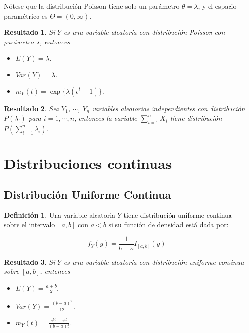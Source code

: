 \documentclass[
  10pt,
  spanish,
]{book}
\providecommand{\tightlist}{%
  \setlength{\itemsep}{0pt}\setlength{\parskip}{0pt}}
\newtheorem{proposition}{Resultado}[chapter]
\theoremstyle{definition}
\newtheorem{definition}{Definición}[chapter]
\theoremstyle{definition}
\theoremstyle{definition}
\theoremstyle{definition}
\theoremstyle{remark}
\begin{document}
Nótese que la distribución Poisson tiene solo un parámetro \(\theta=\lambda\), y el espacio paramétrico es \(\Theta=(0,\infty)\).

\begin{proposition}
\protect\hypertarget{prp:unnamed-chunk-14}{}{\label{prp:unnamed-chunk-14} }Si \(Y\) es una variable aleatoria con distribución Poisson con parámetro \(\lambda\), entonces

\begin{itemize}
\tightlist
\item
  \(E(Y)=\lambda\).
\item
  \(Var(Y)=\lambda\).
\item
  \(m_Y(t)=\exp\{\lambda(e^t-1)\}\).
\end{itemize}
\end{proposition}

\begin{proposition}
\protect\hypertarget{prp:unnamed-chunk-15}{}{\label{prp:unnamed-chunk-15} }Sea \(Y_1\), \(\cdots\), \(Y_n\) variables aleatorias independientes con distribución \(P(\lambda_i)\) para \(i=1,\cdots,n\), entonces la variable \(\sum_{i=1}^nX_i\) tiene distribución \(P(\sum_{i=1}^n\lambda_i)\).
\end{proposition}

\hypertarget{distribuciones-continuas}{%
\section{Distribuciones continuas}\label{distribuciones-continuas}}

\hypertarget{distribuciuxf3n-uniforme-continua}{%
\subsection{Distribución Uniforme Continua}\label{distribuciuxf3n-uniforme-continua}}

\begin{definition}
\protect\hypertarget{def:unnamed-chunk-16}{}{\label{def:unnamed-chunk-16} }Una variable aleatoria \(Y\) tiene distribución uniforme continua sobre el intervalo \([a,b]\) con \(a<b\) si su función de densidad está dada por:

\begin{equation}
f_Y(y)=\frac{1}{b-a}I_{[a,b]}(y)
\end{equation}
\end{definition}

\begin{proposition}
\protect\hypertarget{prp:unnamed-chunk-17}{}{\label{prp:unnamed-chunk-17} }Si \(Y\) es una variable aleatoria con distribución uniforme continua sobre \([a,b]\), entonces

\begin{itemize}
\tightlist
\item
  \(E(Y)=\frac{a+b}{2}\).
\item
  \(Var(Y)=\frac{(b-a)^2}{12}\).
\item
  \(m_Y(t)=\frac{e^{bt}-e^{at}}{(b-a)t}\).
\end{itemize}
\end{proposition}
\end{document}
